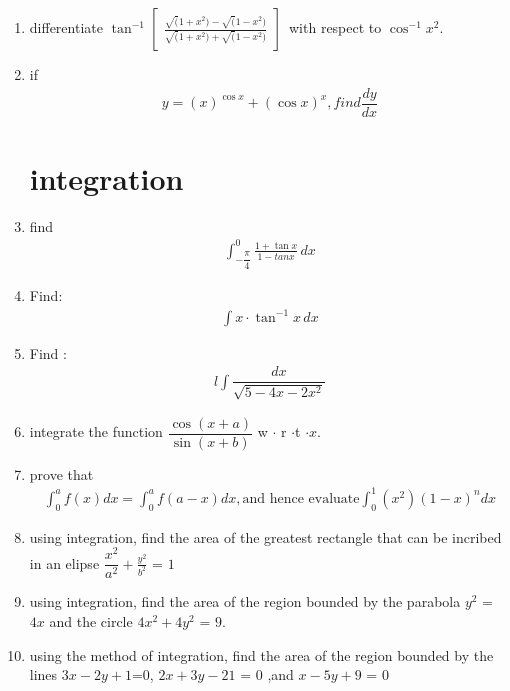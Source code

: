 \documentclass[12pt,-letter paper]{article}
\providecommand{\myvec}[1]{\ensuremath{\begin{bmatrix}#1\end{bmatrix}}}
\begin{document}
\begin{enumerate}
\item differentiate $\tan^{-1} \myvec {\frac{\sqrt(1+x^2)-\sqrt(1-x^2)}{\sqrt(1+x^2)+\sqrt(1-x^2)}}$\, with respect to $\cos^{-1}{x^2}$.
\item if
 \begin{align*}
    y= (x)^{\cos x} + (\cos x)^{x}, find \dfrac{dy}{dx}
     \end{align*}
 \section{integration}
 \item find 
 	\begin{align*}
		\int_{-\dfrac{\pi}{4}}^{0}\frac{1+\tan{x}}{1-tan{x}} \, dx
         \end{align*}
         \item Find:
	\begin{align*}
		\int x \cdot \tan^{-1}{x}\,dx
	\end{align*}
\item Find : 
	\begin{align*}
l		\int \dfrac{dx}{\sqrt{5-4x-2x^2}}
	\end{align*}
 \item integrate the function 
	$\dfrac{\cos(x+a)}{\sin(x+b)}$  w $\cdot$ r $\cdot $t $\cdot x.$
 \item prove that 
	\begin{align*}
		\int_{0}^{a}f(x)dx=\int_{0}^{a}f(a-x)dx, \text{and hence evaluate} \int_{0}^{1}(x^2)(1-x)^n dx 
	\end{align*}
 \item using integration, find the area of the greatest rectangle that can be incribed in an  elipse $\dfrac{x^2}{a^2}+\frac{y^2}{b^2}$ = $1$
 \item using integration, find the area of the region bounded by the parabola $y^2$ = $4x$ and the circle $ 4x^2 + 4y^2$ = $9$.

\item using the method of integration, find the area of the region bounded by the lines $3x-2y+1$=$0$, $2x+3y-21$ = $0$ ,and  $x-5y+9$ = $0$

\end{enumerate}
\end{document}

